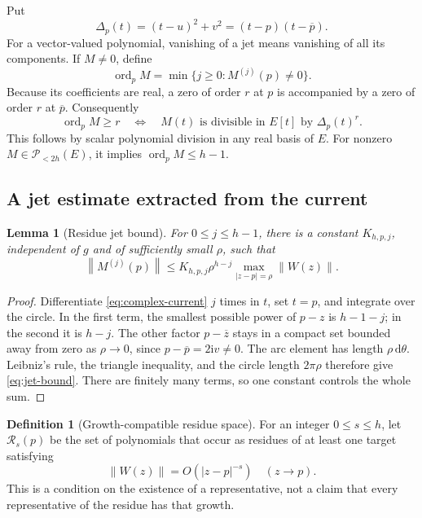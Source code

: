 \documentclass[11pt,a4paper]{article}
\numberwithin{equation}{section}
\newtheorem{lemma}[theorem]{Lemma}
\theoremstyle{definition}
\newtheorem{definition}[theorem]{Definition}
\theoremstyle{remark}
\newcommand{\ii}{\mathrm i}
\newcommand{\PP}{\mathscr P_{<2h}(E)}
\newcommand{\ord}{\operatorname{ord}}
\newcommand{\dd}{\,\mathrm d}
\newcommand{\norm}[1]{\left\lVert#1\right\rVert}
\newcommand{\barz}{\overline z}
\newcommand{\barp}{\overline p}
\begin{document}
Put
\begin{equation}\label{eq:quadratic}
 \Delta_p(t)=(t-u)^2+v^2=(t-p)(t-\barp).
\end{equation}
For a vector-valued polynomial, vanishing of a jet means vanishing of all its
components. If $M\ne0$, define
\[
 \ord_pM=\min\{j\ge0:M^{(j)}(p)\ne0\}.
\]
Because its coefficients are real, a zero of order $r$ at $p$ is accompanied
by a zero of order $r$ at $\barp$. Consequently
\begin{equation}\label{eq:order-divisibility}
 \ord_pM\ge r\quad\Longleftrightarrow\quad
 M(t)\text{ is divisible in }E[t]\text{ by }\Delta_p(t)^r.
\end{equation}
This follows by scalar polynomial division in any real basis of $E$.
For nonzero $M\in\PP$, it implies $\ord_pM\le h-1$.

\subsection{A jet estimate extracted from the current}

\begin{lemma}[Residue jet bound]\label{lem:jet-bound}
For $0\le j\le h-1$, there is a constant $K_{h,p,j}$, independent of $g$
and of sufficiently small $\rho$, such that
\begin{equation}\label{eq:jet-bound}
 \norm{M^{(j)}(p)}
 \le K_{h,p,j}\rho^{h-j}
       \max_{|z-p|=\rho}\norm{W(z)}.
\end{equation}
\end{lemma}

\begin{proof}
Differentiate \eqref{eq:complex-current} $j$ times in $t$, set $t=p$, and
integrate over the circle. In the first term, the smallest possible power of
$p-z$ is $h-1-j$; in the second it is $h-j$. The other factor $p-\barz$
stays in a compact set bounded away from zero as $\rho\to0$, since
$p-\barp=2\ii v\ne0$. The arc element has length $\rho\dd\theta$.
Leibniz's rule, the triangle inequality, and the circle length $2\pi\rho$
therefore give \eqref{eq:jet-bound}. There are finitely many terms, so one
constant controls the whole sum.
\end{proof}

\begin{definition}[Growth-compatible residue space]
For an integer $0\le s\le h$, let $\mathcal R_s(p)$ be the set of polynomials
that occur as residues of at least one target satisfying
\[
 \norm{W(z)}=O(|z-p|^{-s})\quad(z\to p).
\]
This is a condition on the existence of a representative, not a claim that
every representative of the residue has that growth.
\end{definition}
\end{document}
